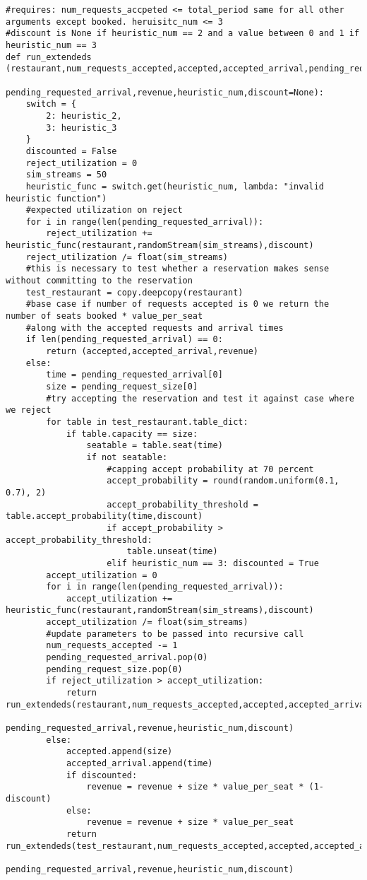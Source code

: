\documentclass[12pt, titlepage]{article}
\begin{document}
\begin{Verbatim}[fontsize=\scriptsize]
#requires: num_requests_accpeted <= total_period same for all other arguments except booked. heruisitc_num <= 3
#discount is None if heuristic_num == 2 and a value between 0 and 1 if heuristic_num == 3
def run_extendeds (restaurant,num_requests_accepted,accepted,accepted_arrival,pending_request_size,
                   pending_requested_arrival,revenue,heuristic_num,discount=None):
    switch = {
        2: heuristic_2,
        3: heuristic_3
    }
    discounted = False
    reject_utilization = 0
    sim_streams = 50
    heuristic_func = switch.get(heuristic_num, lambda: "invalid heuristic function")
    #expected utilization on reject
    for i in range(len(pending_requested_arrival)):
        reject_utilization += heuristic_func(restaurant,randomStream(sim_streams),discount)
    reject_utilization /= float(sim_streams)
    #this is necessary to test whether a reservation makes sense without committing to the reservation
    test_restaurant = copy.deepcopy(restaurant)
    #base case if number of requests accepted is 0 we return the number of seats booked * value_per_seat
    #along with the accepted requests and arrival times
    if len(pending_requested_arrival) == 0:
        return (accepted,accepted_arrival,revenue)
    else:
        time = pending_requested_arrival[0]
        size = pending_request_size[0]
        #try accepting the reservation and test it against case where we reject
        for table in test_restaurant.table_dict:
            if table.capacity == size:
                seatable = table.seat(time)
                if not seatable:
                    #capping accept probability at 70 percent
                    accept_probability = round(random.uniform(0.1, 0.7), 2)
                    accept_probability_threshold = table.accept_probability(time,discount)
                    if accept_probability > accept_probability_threshold:
                        table.unseat(time)
                    elif heuristic_num == 3: discounted = True     
        accept_utilization = 0
        for i in range(len(pending_requested_arrival)):
            accept_utilization += heuristic_func(restaurant,randomStream(sim_streams),discount)
        accept_utilization /= float(sim_streams)
        #update parameters to be passed into recursive call
        num_requests_accepted -= 1
        pending_requested_arrival.pop(0)
        pending_request_size.pop(0)
        if reject_utilization > accept_utilization:
            return run_extendeds(restaurant,num_requests_accepted,accepted,accepted_arrival,pending_request_size,
                                 pending_requested_arrival,revenue,heuristic_num,discount)
        else:
            accepted.append(size)
            accepted_arrival.append(time)
            if discounted:
                revenue = revenue + size * value_per_seat * (1-discount)
            else:
                revenue = revenue + size * value_per_seat
            return run_extendeds(test_restaurant,num_requests_accepted,accepted,accepted_arrival,pending_request_size,
                                 pending_requested_arrival,revenue,heuristic_num,discount)


\end{Verbatim}
\end{document}
